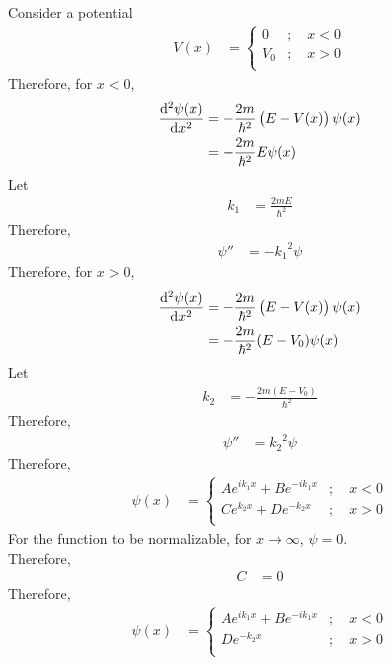 \documentclass[titlepage, fleqn, a4paper, 12pt, twoside]{article}
\theoremstyle{definition}
\theoremstyle{theorem}
\begin{document}
Consider a potential
\begin{align*}
	V(x) &=
		\begin{cases}
			0 &;\quad x < 0\\
			V_0 &;\quad x > 0\\
		\end{cases}
\end{align*}
Therefore, for $x < 0$,
\begin{align*}
	\dod[2]{\psi(x)}{x} &= -\frac{2 m}{\hbar^2} \left( E - V(x) \right) \psi(x)\\
	&= -\frac{2 m}{\hbar^2} E \psi(x)
\end{align*}
Let
\begin{align*}
	k_1 &= \frac{2 m E}{\hbar^2}
\end{align*}
Therefore,
\begin{align*}
	\psi'' &= -{k_1}^2 \psi
\end{align*}
Therefore, for $x > 0$,
\begin{align*}
	\dod[2]{\psi(x)}{x} &= -\frac{2 m}{\hbar^2} \left( E - V(x) \right) \psi(x)\\
	&= -\frac{2 m}{\hbar^2} (E - V_0) \psi(x)
\end{align*}
Let
\begin{align*}
	k_2 &= -\frac{2 m (E - V_0)}{\hbar^2}
\end{align*}
Therefore,
\begin{align*}
	\psi'' &= {k_2}^2 \psi
\end{align*}
Therefore,
\begin{align*}
	\psi(x) &=
		\begin{cases}
			A e^{i k_1 x} + B e^{-i k_1 x} &;\quad x < 0\\
			C e^{k_2 x} + D e^{-k_2 x} &;\quad x > 0\\
		\end{cases}
\end{align*}
For the function to be normalizable, for $x \to \infty$, $\psi = 0$.\\
Therefore,
\begin{align*}
	C &= 0
\end{align*}
Therefore,
\begin{align*}
	\psi(x) &=
		\begin{cases}
			A e^{i k_1 x} + B e^{-i k_1 x} &;\quad x < 0\\
			D e^{-k_2 x} &;\quad x > 0\\
		\end{cases}
\end{align*}
\end{document}
